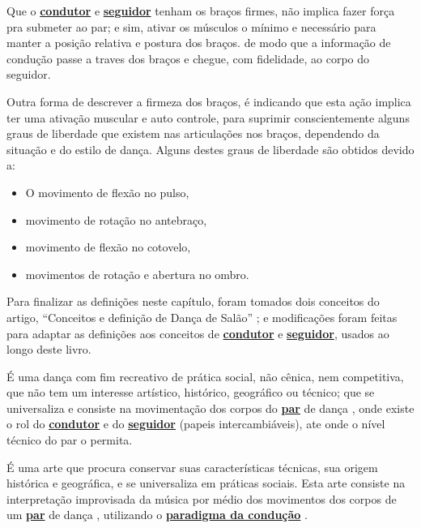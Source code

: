 \begin{definition}
\label{def:brazosfirmes} 
Que o \hyperref[def:Condutor]{\textbf{condutor}} e \hyperref[def:Seguidor]{\textbf{seguidor}}
tenham os braços firmes, não implica fazer força pra submeter ao par;
e sim, ativar os músculos o mínimo e necessário para manter a posição relativa e postura dos braços.
de modo que a informação de condução passe a traves dos braços e chegue, com fidelidade, ao corpo do seguidor.

Outra forma de descrever a firmeza dos braços, 
é indicando que esta ação implica ter uma ativação muscular e auto controle, 
para suprimir conscientemente alguns graus de liberdade que existem nas articulações nos braços, 
dependendo da situação e do estilo de dança.
Alguns destes graus de liberdade são obtidos devido a:
\begin{itemize}
\item O movimento de flexão no pulso,
\item movimento de rotação no antebraço,
\item movimento de flexão no cotovelo,
\item movimentos de rotação e abertura no ombro.
\end{itemize}
\end{definition}


Para finalizar as definições neste capítulo, foram tomados dois conceitos do artigo,
``Conceitos e definição de Dança de Salão'' \cite{Zamoner2012};
e modificações foram feitas para adaptar as definições aos conceitos de \hyperref[def:Condutor]{\textbf{condutor}} e \hyperref[def:Seguidor]{\textbf{seguidor}}, usados ao longo deste livro.

\begin{definition}
\label{def:DancaSocial} 
É uma dança com fim recreativo de prática social, não cênica, nem competitiva, 
que não tem um interesse artístico, histórico, geográfico ou técnico; 
que se universaliza e consiste na movimentação dos corpos do \hyperref[def:Par]{\textbf{par}} de dança  \cite{Zamoner2012}, 
onde existe o rol do \hyperref[def:Condutor]{\textbf{condutor}} 
e do \hyperref[def:Seguidor]{\textbf{seguidor}} (papeis intercambiáveis), 
ate onde o nível técnico do par o permita.
\end{definition}

\begin{definition}
\label{def:DancaSalao}  
É uma arte que procura conservar suas características técnicas, 
sua origem histórica e geográfica, e se universaliza em práticas sociais. 
Esta arte consiste na interpretação improvisada da música por médio dos movimentos 
dos corpos de um \hyperref[def:Par]{\textbf{par}} de dança \cite{Zamoner2012}, 
utilizando o \hyperref[def:ParadigmaConducao]{\textbf{paradigma da condução}} .
\end{definition}


